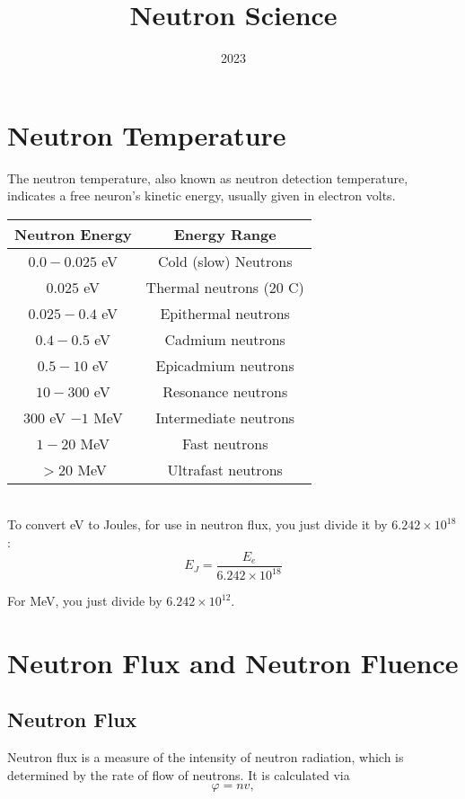 \documentclass{article}
\title{Neutron Science}
\author{}
\date{2023}
\begin{document}
  \maketitle
  \begin{multicols*}{2}
    \section{Neutron Temperature}
    The neutron temperature, also known as neutron detection temperature,
    indicates a free neuron's kinetic energy, usually given in electron volts.\\
    
    \begin{tabular}{|c|c|}
      \hline
      \textbf{Neutron Energy} & \textbf{Energy Range} \\
      \hline
      $0.0 - 0.025$ eV & Cold (slow) Neutrons \\
      $0.025$ eV & Thermal neutrons ($20$ C) \\
      $0.025-0.4$ eV & Epithermal neutrons \\
      $0.4-0.5$ eV & Cadmium neutrons \\
      $0.5-10$ eV & Epicadmium neutrons \\
      $10-300$ eV & Resonance neutrons \\
      $300$ eV $- 1$ MeV & Intermediate neutrons \\
      $1-20$ MeV & Fast neutrons \\
      $> 20$ MeV & Ultrafast neutrons \\
      \hline
    \end{tabular}\\

    To convert eV to Joules, for use in neutron flux, you just
    divide it by $6.242 \times 10^{18}$:
    \[
      E_J = \frac{E_e}{6.242\times10^{18}}
    \]

    For MeV, you just divide by $6.242\times10^{12}$.


    \section{Neutron Flux and Neutron Fluence}
    \subsection{Neutron Flux}
    Neutron flux is a measure of the intensity of neutron radiation,
    which is determined by the rate of flow of neutrons. It is calculated
    via
    \[
      \varphi = nv,
    \] 


\end{multicols*}
\end{document}
